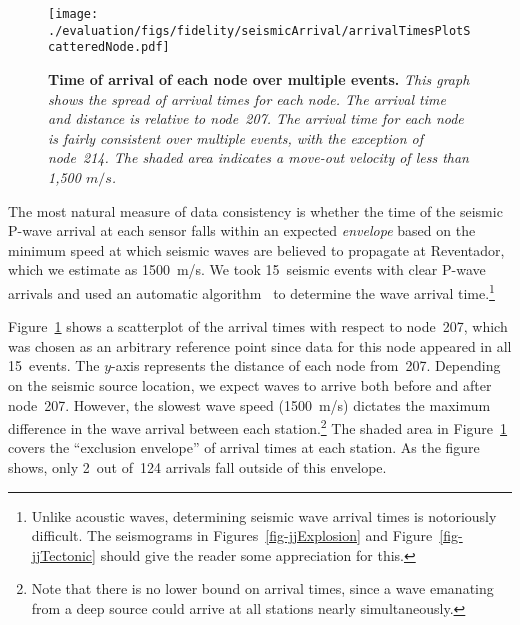 \begin{figure}[t]
\begin{center}
\texttt{[image: ./evaluation/figs/fidelity/seismicArrival/arrivalTimesPlotScatteredNode.pdf]}
\end{center}
\caption{\small{\bf Time of arrival of each node over multiple
events.}  {\em This graph shows the spread of arrival times for each
node.  The arrival time and distance is relative to node~207.  The
arrival time for each node is fairly consistent over multiple events,
with the exception of node~214.  The shaded area indicates a move-out
velocity of less than 1,500 $m/s$.}}
\label{fig-seismicArrivalScatteredNode}
\end{figure}

The most natural measure of data consistency is whether the
time of the seismic P-wave arrival at each sensor falls within 
an expected {\em envelope} based on the minimum speed at which
seismic waves are believed to propagate at Reventador, which 
we estimate as 1500~m/s. We took 15~seismic events with clear
P-wave arrivals and used an automatic algorithm~\cite{pwave-picking} to 
determine the wave arrival time.\footnote{Unlike acoustic
waves, determining seismic wave arrival times is notoriously 
difficult. The seismograms in Figures~\ref{fig-jjExplosion}
and Figure~\ref{fig-jjTectonic} should give the reader some
appreciation for this.} 

Figure~\ref{fig-seismicArrivalScatteredNode} shows a scatterplot of
the arrival times with respect to node~207, which was chosen as an
arbitrary reference point since data for this node appeared in all
15~events. The $y$-axis represents the distance of each node
from~207. Depending on the seismic source location, we expect waves to
arrive both before and after node~207.  However, the slowest wave
speed (1500~m/s) dictates the maximum difference in the wave arrival
between each station.\footnote{Note that there is no lower bound on
arrival times, since a wave emanating from a deep source could arrive
at all stations nearly simultaneously.} The shaded area in
Figure~\ref{fig-seismicArrivalScatteredNode} covers the ``exclusion
envelope'' of arrival times at each station.  As the figure shows,
only 2~out of~124 arrivals fall outside of this envelope.


